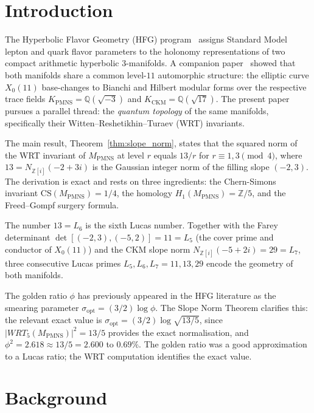 \documentclass[11pt,a4paper]{article}
\theoremstyle{definition}
\newcommand{\MPMNS}{M_{\mathrm{PMNS}}}
\newcommand{\KPMNS}{K_{\mathrm{PMNS}}}
\newcommand{\KCKM}{K_{\mathrm{CKM}}}
\newcommand{\QQ}{\mathbb{Q}}
\newcommand{\Zfive}{\mathbb{Z}/5}
\newcommand{\Zi}{\mathbb{Z}[i]}
\newcommand{\CS}{\mathrm{CS}}
\begin{document}
\tableofcontents

\section{Introduction}
\label{sec:intro}

The Hyperbolic Flavor Geometry (HFG) program~\cite{Gentry:Unified}
assigns Standard Model lepton and quark flavor parameters to the
holonomy representations of two compact arithmetic hyperbolic
3-manifolds.
A companion paper~\cite{Gentry:X011} showed that both manifolds share a
common level-$11$ automorphic structure: the elliptic curve $X_0(11)$
base-changes to Bianchi and Hilbert modular forms over the respective
trace fields $\KPMNS = \QQ(\sqrt{-3})$ and $\KCKM = \QQ(\sqrt{17})$.
The present paper pursues a parallel thread: the \emph{quantum topology}
of the same manifolds, specifically their Witten--Reshetikhin--Turaev
(WRT) invariants.

The main result, Theorem~\ref{thm:slope_norm}, states that the squared
norm of the WRT invariant of $\MPMNS$ at level $r$ equals $13/r$ for
$r \equiv 1,3\pmod 4$, where $13 = N_{\Zi}(-2+3i)$ is the Gaussian
integer norm of the filling slope $(-2,3)$.
The derivation is exact and rests on three ingredients: the Chern-Simons
invariant $\CS(\MPMNS) = 1/4$, the homology $H_1(\MPMNS) = \Zfive$, and
the Freed--Gompf surgery formula.

The number $13 = L_6$ is the sixth Lucas number.
Together with the Farey determinant $\det[(-2,3),(-5,2)] = 11 = L_5$
(the cover prime and conductor of $X_0(11)$) and the CKM slope norm
$N_{\Zi}(-5+2i) = 29 = L_7$, three consecutive Lucas primes
$L_5, L_6, L_7 = 11, 13, 29$ encode the geometry of both manifolds.

The golden ratio $\phi$ has previously appeared in the HFG literature
as the smearing parameter $\sigma_\mathrm{opt} = (3/2)\log\phi$.
The Slope Norm Theorem clarifies this: the relevant exact value is
$\sigma_\mathrm{opt} = (3/2)\log\sqrt{13/5}$, since
$|WRT_5(\MPMNS)|^2 = 13/5$ provides the exact normalisation, and
$\phi^2 = 2.618 \approx 13/5 = 2.600$ to $0.69\%$.
The golden ratio was a good approximation to a Lucas ratio; the WRT
computation identifies the exact value.

\section{Background}
\label{sec:background}
\end{document}
